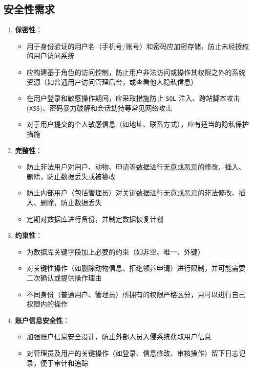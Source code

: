 \documentclass[12pt,a4paper,UTF8]{article}
\begin{document}
\subsection{安全性需求}
\begin{enumerate}
    \item \textbf{保密性}：
    \begin{itemize}
        \item 用于身份验证的用户名（手机号/账号）和密码应加密存储，防止未经授权的用户访问系统
        \item 应构建基于角色的访问控制，防止用户非法访问或操作其权限之外的系统资源（如普通用户访问管理后台，或查看他人隐私信息）
        \item 在用户登录和敏感操作期间，应采取措施防止 \verb|SQL| 注入、跨站脚本攻击 (\verb|XSS|)、密码暴力破解和会话劫持等常见网络攻击
        \item 对于用户提交的个人敏感信息（如地址、联系方式），应有适当的隐私保护措施
    \end{itemize}
    \item \textbf{完整性}：
    \begin{itemize}
        \item 防止非法用户对用户、动物、申请等数据进行无意或恶意的修改、插入、删除，防止数据丢失或被篡改
        \item 防止内部用户（包括管理员）对关键数据进行无意或恶意的非法修改、插入、删除，防止数据丢失
        \item 定期对数据库进行备份，并制定数据恢复计划
    \end{itemize}
    \item \textbf{约束性}：
    \begin{itemize}
        \item 为数据库关键字段加上必要的约束（如非空、唯一、外键）
        \item 对关键性操作（如删除动物信息、拒绝领养申请）进行限制，并可能需要二次确认或提供操作理由
        \item 不同身份（普通用户、管理员）所拥有的权限严格区分，只可以进行自己权限内的操作
    \end{itemize}
    \item \textbf{账户信息安全性}：
    \begin{itemize}
        \item 加强账户信息安全设计，防止外部人员入侵系统获取用户信息
        \item 对管理员及用户的关键操作（如登录、信息修改、审核操作）留下日志记录，便于审计和追踪
    \end{itemize}
\end{enumerate}
\end{document}
